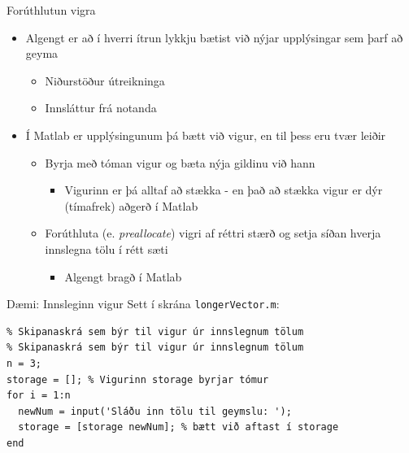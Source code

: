 \documentclass[handout]{beamer}
\begin{document}
\begin{frame}{Forúthlutun vigra}
\vspace{\baselineskip}
\begin{itemize}
 \item Algengt er að í hverri ítrun lykkju bætist við nýjar upplýsingar sem þarf að geyma
 \begin{itemize}
  \item Niðurstöður útreikninga
  \item Innsláttur frá notanda
 \end{itemize}
 \item Í Matlab er upplýsingunum þá bætt við vigur, en til þess eru tvær leiðir
 \begin{itemize}
  \item Byrja með tóman vigur og bæta nýja gildinu við hann
  \begin{itemize}
   \item Vigurinn er þá alltaf að stækka - en það að stækka vigur er dýr (tímafrek) aðgerð í Matlab
  \end{itemize}
  \item Forúthluta (e. \emph{preallocate}) vigri af réttri stærð og setja síðan hverja innslegna tölu í rétt sæti
  \begin{itemize}
   \item Algengt bragð í Matlab
  \end{itemize}
 \end{itemize}
\end{itemize}
\end{frame}

\begin{frame}[fragile]{Dæmi: Innsleginn vigur}
Sett í skrána \texttt{longerVector.m}:
\begin{verbatim}
% Skipanaskrá sem býr til vigur úr innslegnum tölum
% Skipanaskrá sem býr til vigur úr innslegnum tölum
n = 3;
storage = []; % Vigurinn storage byrjar tómur
for i = 1:n
  newNum = input('Sláðu inn tölu til geymslu: ');
  storage = [storage newNum]; % bætt við aftast í storage
end
\end{verbatim}
\end{frame}
\end{document}
